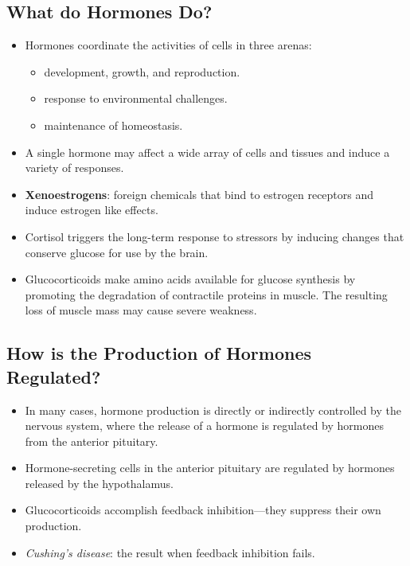 \documentclass[12pt,a4paper]{article}
\begin{document}
\subsection{What do Hormones Do?}
\begin{itemize}   
    \item Hormones coordinate the activities
    of cells in three arenas: 
        \begin{itemize}
            \item development, growth, and reproduction.
            \item response to environmental challenges.
            \item maintenance of homeostasis.
        \end{itemize} 
    \item  A single hormone may affect a wide array of cells and tissues and induce a variety of responses. 
    \item \textbf{Xenoestrogens}: foreign chemicals that bind to estrogen receptors and induce estrogen like effects.
    \item Cortisol triggers the long-term response to stressors by inducing changes that conserve glucose for use by the brain.    
    \item Glucocorticoids make amino acids available for glucose synthesis by promoting the degradation of contractile proteins in muscle. The resulting loss of muscle mass may cause severe weakness.
 \end{itemize}
    
\subsection{How is the Production of Hormones Regulated?}

\begin{itemize}
    \item In many cases, hormone production is directly or indirectly controlled by the nervous system, where the release of a hormone is regulated by hormones from the anterior pituitary.  
    \item Hormone-secreting cells in the anterior pituitary are regulated by hormones released by the hypothalamus.  
    \item Glucocorticoids accomplish feedback inhibition—they suppress their own production.    
    \item \textit{Cushing’s disease}: the result when feedback inhibition fails.
\end{itemize}
\end{document}
